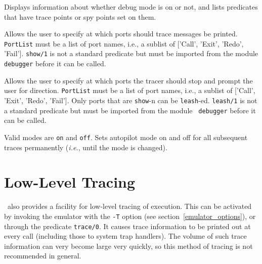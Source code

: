 \begin{description}
 
    Displays information about whether debug mode is on or not, and lists
    predicates that have trace points or spy points set on them.

 
    Allows the user to specify at which ports should trace messages be
    printed. {\tt PortList} must be a list of port names, i.e., a sublist
    of ['Call', 'Exit', 'Redo', 'Fail']. {\tt show/1} is not a standard
    predicate but must be imported from the module {\tt debugger} before
    it can be called.

 
    Allows the user to specify at which ports the tracer should stop
    and prompt the user for direction.  {\tt PortList} must be a list of
    port names, i.e., a sublist of ['Call', 'Exit', 'Redo', 'Fail'].  Only
    ports that are {\tt show}-n can be {\tt leash}-ed.  {\tt leash/1} is
    not a standard predicate but must be imported from the module {\tt
    debugger} before it can be called.

 
    Valid modes are {\tt on} and {\tt off}. Sets autopilot mode on and off
    for all subsequent traces permanently ({\it i.e.}, until the mode is
    changed).
\end{description}


\section{Low-Level Tracing}
 

\ourprolog\ also provides a facility for low-level tracing of execution.
This can be activated by invoking the emulator with the {\tt -T} option
(see section~\ref{emulator_options}), or through the predicate {\tt trace/0}.
It causes trace information to be printed out at every call (including
those to system trap handlers).  The volume of such trace information
can very become large very quickly, so this method of tracing is not
recommended in general.


